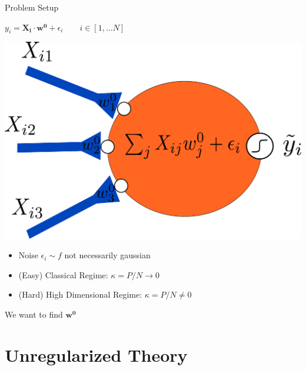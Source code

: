 \documentclass[pdf]{beamer}
\newcommand{\ra}{\rightarrow}
\begin{document}
\begin{frame}[t]{Problem Setup}


\parbox{.45\linewidth}{
$y_i = \mathbf{X_i}\cdot \mathbf{w^0} + \epsilon_i \quad \quad i\in [1,\dots N]$
}
\parbox{.45\linewidth}{
\begin{flushright}
\includegraphics[width = .5\linewidth]{neuronInference.pdf}
\end{flushright}
}


\begin{itemize}

\vspace{.05in}
\item Noise $\epsilon_i \sim f$ not necessarily gaussian
\vspace{.05in}
\item (Easy) Classical Regime: $\kappa = P/N\ra 0$
\vspace{.05in}
\item (Hard) High Dimensional Regime: $\kappa = P/N \ne 0$

\end{itemize}
\vspace{.2in}

We want to find $\mathbf{w^0}$
\end{frame}



\section{Unregularized Theory}
\frame{\sectionpage}
\end{document}

